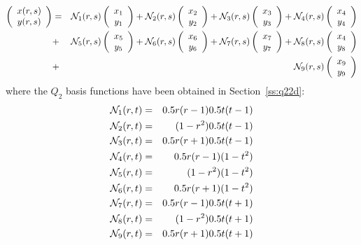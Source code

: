 \begin{eqnarray}
\left(
\begin{array}{c}
x(r,s) \\ y(r,s)
\end{array}
\right)
&=&
{\mathcal{N}}_1(r,s)
\left(
\begin{array}{c}
x_1 \\ y_1
\end{array}
\right)
+
{\mathcal{N}}_2(r,s)
\left(
\begin{array}{c}
x_2 \\ y_2
\end{array}
\right)
+
{\mathcal{N}}_3(r,s)
\left(
\begin{array}{c}
x_3 \\ y_3
\end{array}
\right)
+
{\mathcal{N}}_4(r,s)
\left(
\begin{array}{c}
x_4 \\ y_4
\end{array}
\right) \nonumber\\
&+&
{\mathcal{N}}_5(r,s)
\left(
\begin{array}{c}
x_5 \\ y_5
\end{array}
\right)
+
{\mathcal{N}}_6(r,s)
\left(
\begin{array}{c}
x_6 \\ y_6
\end{array}
\right)
+
{\mathcal{N}}_7(r,s)
\left(
\begin{array}{c}
x_7 \\ y_7
\end{array}
\right)
+
{\mathcal{N}}_8(r,s)
\left(
\begin{array}{c}
x_4 \\ y_8
\end{array}
\right) \nonumber\\
&+&
{\mathcal{N}}_9(r,s)
\left(
\begin{array}{c}
x_9 \\ y_9
\end{array}
\right) 
\nonumber
\end{eqnarray}
where the $Q_2$ basis functions have been obtained in Section~\ref{ss:q22d}:
\begin{eqnarray}
{\mathcal{N}}_1(r,t)&=& 0.5r(r-1)  0.5t(t-1) \nonumber\\
{\mathcal{N}}_2(r,t)&=&      (1-r^2)  0.5t(t-1) \nonumber\\
{\mathcal{N}}_3(r,t)&=& 0.5r(r+1)  0.5t(t-1) \nonumber\\
{\mathcal{N}}_4(r,t)&=& 0.5r(r-1)       (1-t^2) \nonumber\\
{\mathcal{N}}_5(r,t)&=&      (1-r^2)       (1-t^2) \nonumber\\
{\mathcal{N}}_6(r,t)&=& 0.5r(r+1)       (1-t^2) \nonumber\\
{\mathcal{N}}_7(r,t)&=& 0.5r(r-1)  0.5t(t+1) \nonumber\\
{\mathcal{N}}_8(r,t)&=&      (1-r^2)  0.5t(t+1) \nonumber\\
{\mathcal{N}}_9(r,t)&=& 0.5r(r+1)  0.5t(t+1) \nonumber
\end{eqnarray}



